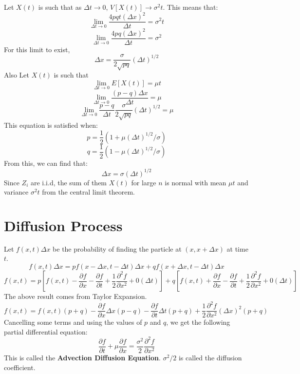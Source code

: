 \documentclass[12pt,letterpaper]{book}
\theoremstyle{definition}
\begin{document}
Let $X(t)$ is such that as $\Delta t \rightarrow 0$, $V[X(t)] \rightarrow \sigma^2t$. This means that:
\[\lim_{\Delta t \rightarrow 0} \frac{4pqt (\Delta x)^2}{\Delta t} = \sigma^2 t\]
\[\lim_{\Delta t \rightarrow 0} \frac{4pq (\Delta x)^2}{\Delta t} = \sigma^2\]
For this limit to exist, 
\[\Delta x = \frac{\sigma}{2\sqrt{pq}} (\Delta t)^{1/2}\]
Also Let $X(t)$ is such that 
\[\lim_{\Delta t \rightarrow 0} E[X(t)] = \mu t\]
\[\lim_{\Delta t \rightarrow 0} \frac{(p-q) \Delta x}{\Delta t} = \mu\]
\[\lim_{\Delta t \rightarrow 0} \frac{p-q}{\Delta t} \frac{\sigma}{2\sqrt{pq}} (\Delta t)^{1/2} = \mu\]
This equation is satisfied when:
\[p = \frac{1}{2} (1 + \mu (\Delta t)^{1/2} / \sigma)\]
\[q = \frac{1}{2} (1 - \mu (\Delta t)^{1/2} / \sigma)\]
From this, we can find that:
\[\Delta x = \sigma (\Delta t)^{1/2}\]
Since $Z_i$ are i.i.d, the sum of them $X(t)$ for large $n$ is normal with mean $\mu t$ and variance $\sigma^2 t$ from the central limit theorem.



\section{Diffusion Process}

Let $f(x,t) \Delta x$ be the probability of finding the particle at $(x, x+ \Delta x)$ at time $t$.
\[f(x,t) \Delta x = p f(x - \Delta x, t - \Delta t) \Delta x + q f(x + \Delta x, t - \Delta t) \Delta x\]
\[f(x,t) = p \left[f(x,t) - \frac{\partial f}{\partial x} - \frac{\partial f}{\partial t} + \frac{1}{2} \frac{\partial ^ 2 f}{\partial x^2} + 0 (\Delta t) \right] + q\left[f(x,t) + \frac{\partial f}{\partial x} - \frac{\partial f}{\partial t} + \frac{1}{2} \frac{\partial ^ 2 f}{\partial x^2} + 0 (\Delta t) \right]  \]
The above result comes from Taylor Expansion.
\[f(x,t) = f(x,t)(p+q) - \frac{\partial f}{\partial x} \Delta x (p-q) - \frac{\partial f}{\partial t} \Delta t (p+q) + \frac{1}{2} \frac{\partial^2 f}{\partial x^2} (\Delta x)^2 (p+q) \]
Cancelling some terms and using the values of $p$ and $q$, we get the following partial differential equation:
\[\frac{\partial f}{\partial t} + \mu \frac{\partial f}{\partial x} = \frac{\sigma^2}{2} \frac{\partial^2 f}{\partial x^2}\]
This is called the \textbf{Advection Diffusion Equation}. $\sigma^2/2$ is called the diffusion coefficient.
\end{document}
